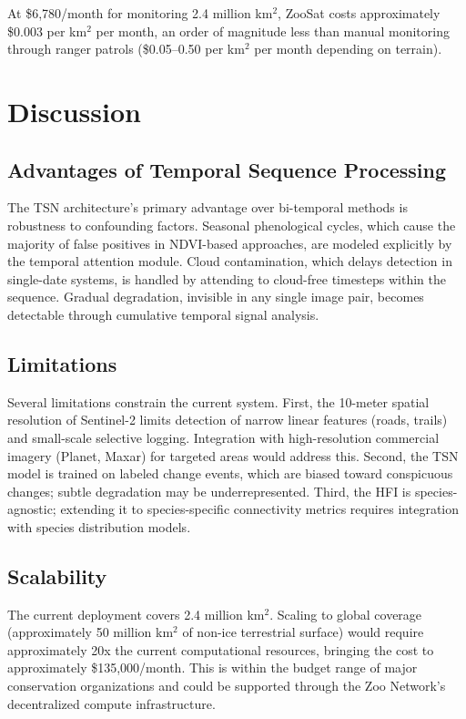 \documentclass[11pt,a4paper]{article}
\begin{document}
At \$6,780/month for monitoring 2.4 million km$^2$, ZooSat costs approximately \$0.003 per km$^2$ per month, an order of magnitude less than manual monitoring through ranger patrols (\$0.05--0.50 per km$^2$ per month depending on terrain).

\section{Discussion}
\label{sec:discussion}

\subsection{Advantages of Temporal Sequence Processing}

The TSN architecture's primary advantage over bi-temporal methods is robustness to confounding factors.
Seasonal phenological cycles, which cause the majority of false positives in NDVI-based approaches, are modeled explicitly by the temporal attention module.
Cloud contamination, which delays detection in single-date systems, is handled by attending to cloud-free timesteps within the sequence.
Gradual degradation, invisible in any single image pair, becomes detectable through cumulative temporal signal analysis.

\subsection{Limitations}

Several limitations constrain the current system.
First, the 10-meter spatial resolution of Sentinel-2 limits detection of narrow linear features (roads, trails) and small-scale selective logging.
Integration with high-resolution commercial imagery (Planet, Maxar) for targeted areas would address this.
Second, the TSN model is trained on labeled change events, which are biased toward conspicuous changes; subtle degradation may be underrepresented.
Third, the HFI is species-agnostic; extending it to species-specific connectivity metrics requires integration with species distribution models.

\subsection{Scalability}

The current deployment covers 2.4 million km$^2$.
Scaling to global coverage (approximately 50 million km$^2$ of non-ice terrestrial surface) would require approximately 20x the current computational resources, bringing the cost to approximately \$135,000/month.
This is within the budget range of major conservation organizations and could be supported through the Zoo Network's decentralized compute infrastructure.
\end{document}
